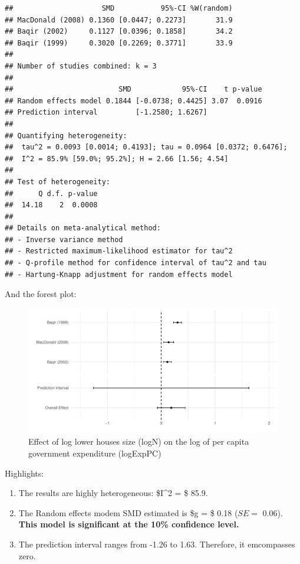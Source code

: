 \documentclass[
]{article}
\providecommand{\tightlist}{%
  \setlength{\itemsep}{0pt}\setlength{\parskip}{0pt}}
\begin{document}
\begin{verbatim}
##                     SMD           95%-CI %W(random)
## MacDonald (2008) 0.1360 [0.0447; 0.2273]       31.9
## Baqir (2002)     0.1127 [0.0396; 0.1858]       34.2
## Baqir (1999)     0.3020 [0.2269; 0.3771]       33.9
## 
## Number of studies combined: k = 3
## 
##                         SMD            95%-CI    t p-value
## Random effects model 0.1844 [-0.0738; 0.4425] 3.07  0.0916
## Prediction interval         [-1.2580; 1.6267]             
## 
## Quantifying heterogeneity:
##  tau^2 = 0.0093 [0.0014; 0.4193]; tau = 0.0964 [0.0372; 0.6476];
##  I^2 = 85.9% [59.0%; 95.2%]; H = 2.66 [1.56; 4.54]
## 
## Test of heterogeneity:
##      Q d.f. p-value
##  14.18    2  0.0008
## 
## Details on meta-analytical method:
## - Inverse variance method
## - Restricted maximum-likelihood estimator for tau^2
## - Q-profile method for confidence interval of tau^2 and tau
## - Hartung-Knapp adjustment for random effects model
\end{verbatim}

And the forest plot:

\begin{figure}
\centering
\includegraphics{appendixV5_files/figure-latex/unnamed-chunk-25-1.pdf}
\caption{Effect of log lower houses size (logN) on the log of per capita
government expenditure (logExpPC)}
\end{figure}

Highlights:

\begin{enumerate}
\def\labelenumi{\arabic{enumi}.}
\tightlist
\item
  The results are highly heterogeneous: \$I\^{}2 = \$ 85.9.
\item
  The Random effects modem SMD estimated is \$g = \$ 0.18 (\(SE =\)
  0.06). \textbf{This model is significant at the 10\% confidence
  level.}
\item
  The prediction interval ranges from -1.26 to 1.63. Therefore, it
  emcompasses zero.
\end{enumerate}
\end{document}
